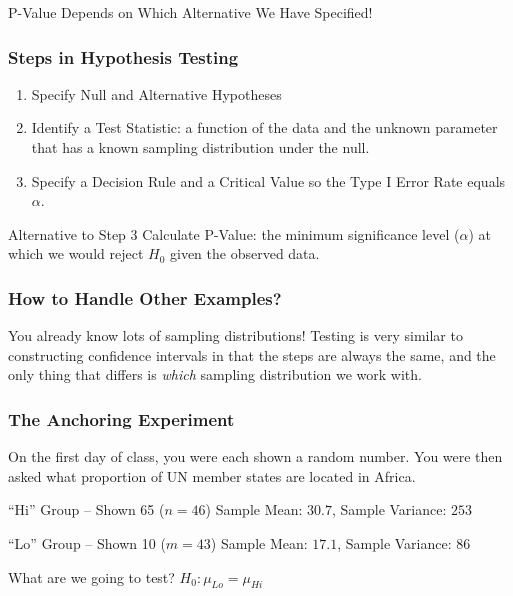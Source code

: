 \documentclass[handout]{beamer}
\begin{document}
\begin{frame}
\begin{center}
\huge P-Value Depends on Which Alternative We Have Specified!
\end{center}
\end{frame}

\begin{frame}
\frametitle{Steps in Hypothesis Testing}

\begin{enumerate}
\item Specify Null and Alternative Hypotheses
\item Identify a Test Statistic: a function of the data and the unknown parameter that has a known sampling distribution under the null.
\item Specify a Decision Rule and a Critical Value so the Type I Error Rate equals $\alpha$.
\end{enumerate}

\begin{alertblock}{Alternative to Step 3}
	Calculate P-Value: the minimum significance level  ($\alpha$) at which we would reject $H_0$ given the observed data.
\end{alertblock}

\end{frame}


\begin{frame}
\frametitle{How to Handle Other Examples?}

\alert{You already know lots of sampling distributions! Testing is very similar to constructing confidence intervals in that the steps are always the same, and the only thing that differs is \emph{which} sampling distribution we work with.}

\end{frame}




\begin{frame}
\frametitle{The Anchoring Experiment}
On the first day of class, you were each shown a random number. You were then asked what proportion of UN member states are located in Africa. 

	\begin{block}{``Hi'' Group -- Shown 65 ($n=46$)}
		Sample Mean: $30.7$, Sample Variance: $253$
\end{block}


	\begin{block}{``Lo'' Group -- Shown 10 ($m=43$)}
	Sample Mean: $17.1$, Sample Variance: $86$
\end{block}

\begin{alertblock}{What are we going to test?}
	$H_0\colon \mu_{Lo} = \mu_{Hi}$
\end{alertblock}
\end{frame}
\end{document}
